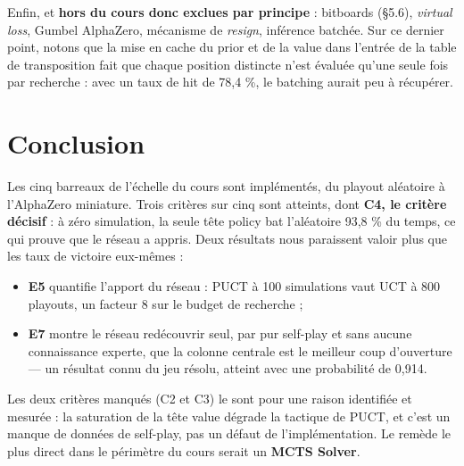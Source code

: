 \documentclass[11pt,a4paper]{article}
\begin{document}
Enfin, et \textbf{hors du cours donc exclues par principe} : bitboards (§5.6),
\emph{virtual loss}, Gumbel AlphaZero, mécanisme de \emph{resign}, inférence batchée. Sur ce
dernier point, notons que la mise en cache du prior et de la value dans l'entrée de
la table de transposition fait que chaque position distincte n'est évaluée qu'une
seule fois par recherche : avec un taux de hit de 78,4 \%, le batching aurait peu à
récupérer.

\section{Conclusion}
\label{sec:conclusion}

Les cinq barreaux de l'échelle du cours sont implémentés, du playout aléatoire à
l'AlphaZero miniature. Trois critères sur cinq sont atteints, dont \textbf{C4, le critère décisif} : à zéro
simulation, la seule tête policy bat l'aléatoire 93,8 \% du temps, ce qui prouve que
le réseau a appris. Deux résultats nous paraissent valoir plus que les taux de
victoire eux-mêmes :

\begin{itemize}
\setlength{\itemsep}{1pt}\setlength{\parskip}{0pt}
\item
  \textbf{E5} quantifie l'apport du réseau : PUCT à 100 simulations vaut UCT à
  800 playouts, un facteur 8 sur le budget de recherche ;
\item
  \textbf{E7} montre le réseau redécouvrir seul, par pur self-play et sans aucune
  connaissance experte, que la colonne centrale est le meilleur coup d'ouverture ---
  un résultat connu du jeu résolu, atteint avec une probabilité de 0,914.
\end{itemize}

Les deux critères manqués (C2 et C3) le sont pour une raison identifiée et
mesurée : la saturation de la tête
value dégrade la tactique de PUCT, et c'est un manque de données de self-play, pas
un défaut de l'implémentation. Le remède le plus direct dans le périmètre du cours
serait un \textbf{MCTS Solver}.
\end{document}
